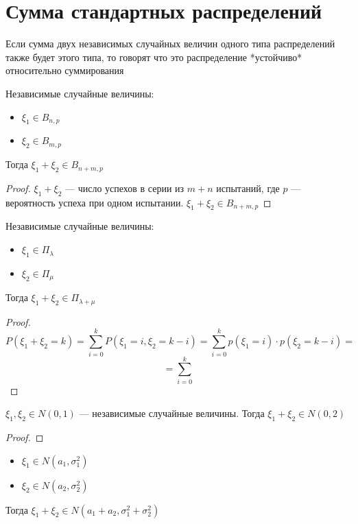 \section{Сумма стандартных распределений}

\begin{definition}
    Если сумма двух независимых случайных величин одного типа распределений также будет этого типа, то говорят что это распределение *устойчиво* относительно суммирования
\end{definition}
\begin{example}
    Независимые случайные величины:
    \begin{itemize}
        \item \(\xi_1 \in B_{n, p}\)
        \item \(\xi_2 \in B_{m, p}\)
    \end{itemize}
    Тогда \(\xi_1 + \xi_2 \in B_{n + m, p}\)
\end{example}
\begin{proof}
    \(\xi_1 + \xi_2\) --- число успехов в серии из \(m + n\) испытаний, где \(p\) --- вероятность успеха при одном испытании. \(\xi_1 + \xi_2 \in B_{n + m, p}\)
\end{proof}
\begin{example}
    Независимые случайные величины:
    \begin{itemize}
        \item \(\xi_1 \in \Pi_\lambda\)
        \item \(\xi_2 \in \Pi_\mu\)
    \end{itemize}
    Тогда \(\xi_1 + \xi_2 \in \Pi_{\lambda + \mu}\)
\end{example}
\begin{proof}
    \[ P(\xi_1 + \xi_2 = k) = \sum_{i = 0}^k P(\xi_1 = i, \xi_2 = k - i) = \sum_{i = 0}^k p(\xi_1 = i)\cdot p(\xi_2 = k - i) = \]
    \[ = \sum_{i = 0}^k \]
    \unfinished
\end{proof}
\begin{example}
    \(\xi_1, \xi_2 \in N(0, 1)\) --- независимые случайные величины. Тогда \(\xi_1 + \xi_2 \in N(0, 2)\)
\end{example}
\begin{proof}
    \unfinished
\end{proof}
\begin{example}\itemfix
    \begin{itemize}
        \item \(\xi_1 \in N(a_1, \sigma_1^2)\)
        \item \(\xi_2 \in N(a_2, \sigma_2^2)\)
    \end{itemize}
    Тогда \(\xi_1 + \xi_2 \in N(a_1 + a_2, \sigma_1^2 + \sigma_2^2)\)
\end{example}
